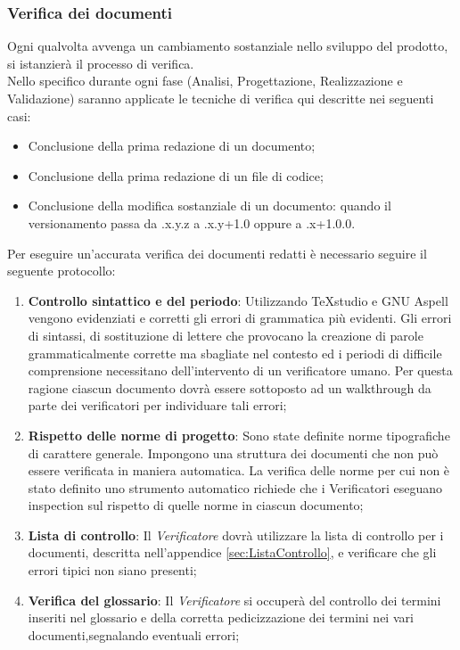 {	\subsubsection{Verifica dei documenti}
	\label{sec:VerificaDocumenti}
	Ogni qualvolta avvenga un cambiamento sostanziale nello sviluppo del prodotto, si istanzierà il processo di verifica. \\
		Nello specifico durante ogni fase (Analisi, Progettazione, Realizzazione e Validazione) saranno applicate le tecniche di verifica qui descritte nei seguenti casi:
		\begin{itemize}
			\item Conclusione della prima redazione di un documento;
			\item Conclusione della prima redazione di un file\ped{g} di codice;
			\item Conclusione della modifica sostanziale di un documento: quando il versionamento passa da .x.y.z a .x.y+1.0 oppure a .x+1.0.0.
		\end{itemize}
	Per eseguire un'accurata verifica dei documenti redatti è necessario seguire il seguente protocollo:
	\begin{enumerate}
	\item \textbf{Controllo sintattico e del periodo}: Utilizzando TeXstudio e GNU Aspell vengono evidenziati e corretti gli errori di grammatica più evidenti. Gli errori di sintassi, di sostituzione di lettere che provocano la creazione di parole grammaticalmente corrette ma sbagliate nel contesto ed i periodi di difficile comprensione necessitano dell’intervento di un verificatore umano. Per questa ragione ciascun documento dovrà essere sottoposto ad un walkthrough da parte dei verificatori per individuare tali errori;
	\item \textbf{Rispetto delle norme di progetto}: Sono state definite norme tipografiche di carattere generale. Impongono una struttura dei documenti che non può essere verificata in maniera automatica. La verifica delle norme
	per cui non è stato definito uno strumento automatico richiede che i Verificatori eseguano inspection sul rispetto di quelle norme in ciascun documento;
	\item \textbf{Lista di controllo}: Il \emph{Verificatore} dovrà utilizzare la lista di controllo per i
	documenti, descritta nell’appendice \ref{sec:ListaControllo}, e verificare che gli errori tipici non siano	presenti;
	\item \textbf{Verifica del glossario}: Il \emph{Verificatore} si occuperà del controllo dei termini inseriti nel glossario e della corretta pedicizzazione dei termini nei vari documenti,segnalando eventuali errori;

\end{enumerate}}
